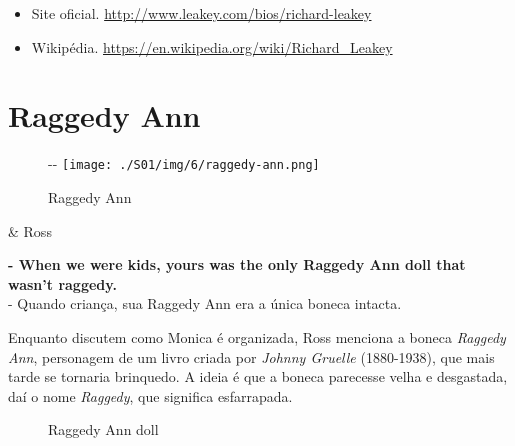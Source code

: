 \begin{itemize}
\tightlist
\item
  \sloppy Site oficial. \url{http://www.leakey.com/bios/richard-leakey}
\item
  \sloppy Wikipédia. \url{https://en.wikipedia.org/wiki/Richard_Leakey}
\end{itemize}

\hypertarget{raggedy-ann}{%
\section{Raggedy Ann}\label{raggedy-ann}}

\begin{figure}[!ht]
  \begin{adjustwidth}{-\oddsidemargin-1in}{-\rightmargin}
    \centering
    \texttt{[image: ./S01/img/6/raggedy-ann.png]}
    \caption{Raggedy Ann\label{fig:raggedy-ann}}
  \end{adjustwidth}
\end{figure}

\begin{tcolorbox}[enhanced,center upper,
    drop fuzzy shadow southeast, boxrule=0.3pt,
    lower separated=false,
    colframe=black!30!dialogoBorder,colback=white]
\begin{minipage}[c]{0.16\linewidth}
   & \centering \scriptsize{Ross}
\end{minipage}
\hfill
\begin{minipage}[c]{0.8\linewidth}
  \textbf{- When we were kids, yours was the only Raggedy Ann doll that wasn't raggedy.}\\
  - Quando criança, sua Raggedy Ann era a única boneca intacta.
\end{minipage}
\end{tcolorbox}

Enquanto discutem como Monica é organizada, Ross menciona a boneca
\emph{Raggedy Ann}, personagem de um livro criada por \emph{Johnny
Gruelle} (1880-1938), que mais tarde se tornaria brinquedo. A ideia é
que a boneca parecesse velha e desgastada, daí o nome \emph{Raggedy},
que significa esfarrapada.

\begin{figure}
  \centering
    \caption{Raggedy Ann doll\label{fig:raggedy-ann-doll}}
\end{figure}

